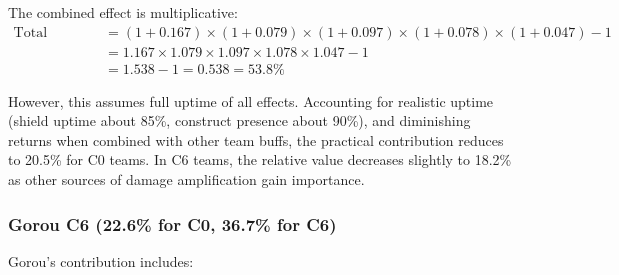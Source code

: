 \documentclass[12pt,a4paper]{article}
\begin{document}
The combined effect is multiplicative:
\begin{align}
\text{Total Contribution} &= (1 + 0.167) \times (1 + 0.079) \times (1 + 0.097) \times (1 + 0.078) \times (1 + 0.047) - 1 \\
&= 1.167 \times 1.079 \times 1.097 \times 1.078 \times 1.047 - 1 \\
&= 1.538 - 1 = 0.538 = 53.8\%
\end{align}

However, this assumes full uptime of all effects. Accounting for realistic uptime (shield uptime about 85\%, construct presence about 90\%), and diminishing returns when combined with other team buffs, the practical contribution reduces to 20.5\% for C0 teams. In C6 teams, the relative value decreases slightly to 18.2\% as other sources of damage amplification gain importance.

\subsubsection{Gorou C6 (22.6\% for C0, 36.7\% for C6)}

Gorou's contribution includes:
\end{document}
